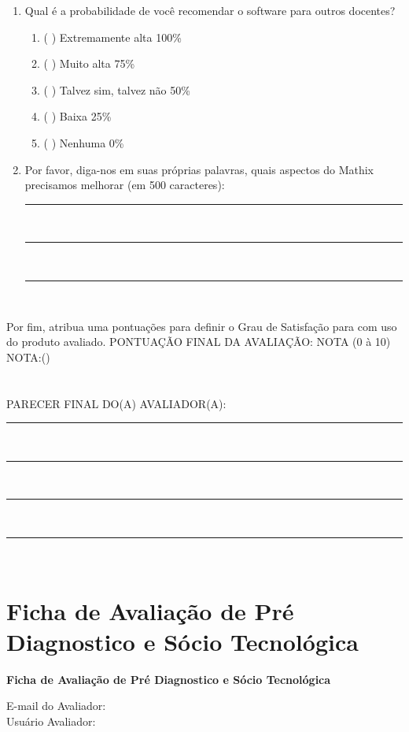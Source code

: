 \begin{apendicesenv}
\begin{enumerate}
    \item Qual é a probabilidade de você recomendar o software para outros docentes?
    \begin{enumerate}
        \item ( ) Extremamente alta 100\%
        \item ( ) Muito alta 75\%
        \item ( ) Talvez sim, talvez não 50\%
        \item ( ) Baixa 25\%
        \item ( ) Nenhuma 0\%
    \end{enumerate}


    \item Por favor, diga-nos em suas próprias palavras, quais aspectos do Mathix precisamos melhorar (em 500 caracteres):\hrulefill \\
    \rule{15cm}{.1pt}\\
    \rule{15cm}{.1pt}\\
    \rule{15cm}{.1pt}\\
    
\end{enumerate}

Por fim, atribua uma pontuações para definir o Grau de Satisfação para com uso do produto avaliado.
PONTUAÇÃO FINAL DA AVALIAÇÃO: NOTA (0 à 10) NOTA:(\space\space\space\space)
\\
\\
\\
   PARECER FINAL DO(A) AVALIADOR(A):\hrulefill \\
        \rule{16cm}{.1pt}\\
        \rule{16cm}{.1pt}\\
        \rule{16cm}{.1pt}\\
        \rule{16cm}{.1pt}\\
        









\chapter{Ficha de Avaliação de Pré Diagnostico e Sócio Tecnológica}

\begin{center}
\textbf{
Ficha de Avaliação de Pré Diagnostico e Sócio Tecnológica
}
\end{center}
E-mail do Avaliador:\hrulefill \\
Usuário Avaliador:\hrulefill \\


\end{apendicesenv}
